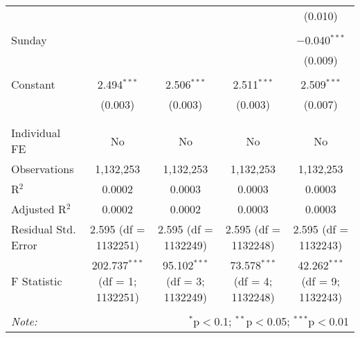 \documentclass[
]{article}
\begin{document}
\begin{table}[!htbp]
{\begin{tabular}{@{\extracolsep{5pt}}lcccc}
  &  &  &  & (0.010) \\ 
  & & & & \\ 
 Sunday &  &  &  & $-$0.040$^{***}$ \\ 
  &  &  &  & (0.009) \\ 
  & & & & \\ 
 Constant & 2.494$^{***}$ & 2.506$^{***}$ & 2.511$^{***}$ & 2.509$^{***}$ \\ 
  & (0.003) & (0.003) & (0.003) & (0.007) \\ 
  & & & & \\ 
\hline \\[-1.8ex] 
Individual FE & No & No & No & No \\ 
Observations & 1,132,253 & 1,132,253 & 1,132,253 & 1,132,253 \\ 
R$^{2}$ & 0.0002 & 0.0003 & 0.0003 & 0.0003 \\ 
Adjusted R$^{2}$ & 0.0002 & 0.0002 & 0.0003 & 0.0003 \\ 
Residual Std. Error & 2.595 (df = 1132251) & 2.595 (df = 1132249) & 2.595 (df = 1132248) & 2.595 (df = 1132243) \\ 
F Statistic & 202.737$^{***}$ (df = 1; 1132251) & 95.102$^{***}$ (df = 3; 1132249) & 73.578$^{***}$ (df = 4; 1132248) & 42.262$^{***}$ (df = 9; 1132243) \\ 
\hline 
\hline \\[-1.8ex] 
\textit{Note:}  & \multicolumn{4}{r}{$^{*}$p$<$0.1; $^{**}$p$<$0.05; $^{***}$p$<$0.01} \\ 
\end{tabular}
} 
\end{table} 
\newpage
\end{document}
